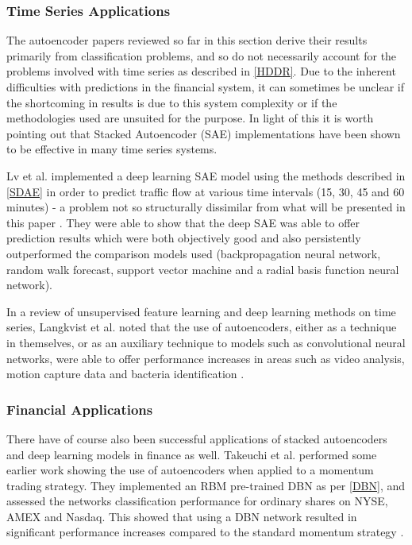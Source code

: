 \documentclass[a4paper,latin]{paper}
\begin{document}
\subsubsection {Time Series Applications}

The autoencoder papers reviewed so far in this section derive their results primarily from classification problems, 
and so do not necessarily account for the problems involved with time series as described in \ref{HDDR}. Due to 
the inherent difficulties with predictions in the financial system, it can sometimes be unclear if the shortcoming in 
results is due to this system complexity or if the methodologies used are unsuited for the purpose. In light of this 
it is worth pointing out that Stacked Autoencoder (SAE) implementations have been shown to be effective in many
 time series systems.  
 \hfill \break 

Lv et al.  implemented a deep learning SAE model using the methods described in \ref{SDAE} in order to 
predict traffic flow at various time intervals (15, 30, 45 and 60 minutes) - a problem not so structurally dissimilar 
from what will be presented in this paper \cite{Lv}. They were able to show that the deep SAE was able to offer prediction 
results which were both objectively good and also persistently outperformed the comparison models used 
(backpropagation neural network, random walk forecast, support vector machine and a radial basis function 
neural network).
\hfill \break 

In a review of unsupervised feature learning and deep learning methods on time series, Langkvist et al. noted that 
the use of autoencoders, either as a technique in themselves, or as an auxiliary technique to models 
such as convolutional neural networks, were able to offer performance increases in areas such as video analysis, 
motion capture data and bacteria identification \cite{Langkvist}.
 
\subsubsection{Financial Applications}

There have of course also been successful applications of stacked autoencoders and deep learning models in 
finance as well. Takeuchi et al. performed some earlier work showing the use of autoencoders when applied to a 
momentum trading strategy. They implemented an RBM pre-trained DBN as per \ref{DBN}, and assessed the 
networks classification performance for ordinary shares on NYSE, AMEX and Nasdaq. This showed that using a 
DBN network resulted in significant performance increases compared to the standard momentum strategy \cite{Takeuchi}.
\hfill \break 
\end{document}

